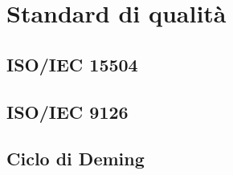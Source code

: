 \section{Standard di qualità}

\subsection{ISO/IEC 15504}

\subsection{ISO/IEC 9126}

\subsection{Ciclo di Deming}
